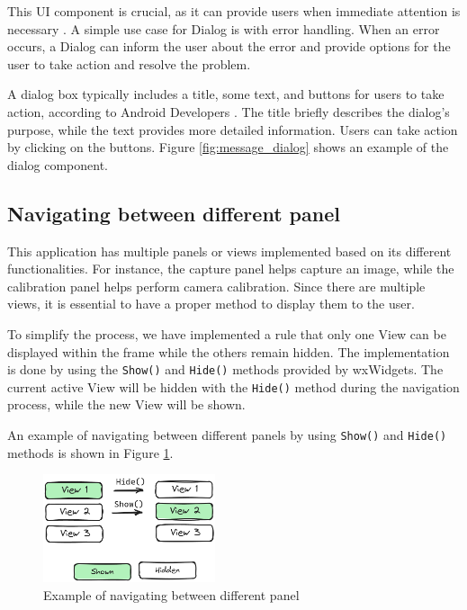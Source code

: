 This UI component is crucial, as it can provide users when immediate attention is necessary \cite{MaterialUI}. A simple use case for Dialog is with error handling. When an error occurs, a Dialog can inform the user about the error and provide options for the user to take action and resolve the problem.

A dialog box typically includes a title, some text, and buttons for users to take action, according to Android Developers \cite{Android_Developers}. The title briefly describes the dialog's purpose, while the text provides more detailed information. Users can take action by clicking on the buttons. Figure \ref{fig:message_dialog} shows an example of the dialog component.

\subsection{Navigating between different panel}
\label{subsec:navigating_between_different_panel}

This application has multiple panels or views implemented based on its different functionalities. For instance, the capture panel helps capture an image, while the calibration panel helps perform camera calibration. Since there are multiple views, it is essential to have a proper method to display them to the user.

To simplify the process, we have implemented a rule that only one View can be displayed within the frame while the others remain hidden. The implementation is done by using the \texttt{Show()} and \texttt{Hide()} methods provided by wxWidgets. The current active View will be hidden with the \texttt{Hide()} method during the navigation process, while the new View will be shown.

An example of navigating between different panels by using \texttt{Show()} and \texttt{Hide()} methods is shown in Figure \ref{fig:show_panel}.

\begin{figure}[!ht]
    \centering
    \includegraphics[width=0.45\textwidth]{texs/Part2/chapter4/image/showpanel.png}
    \caption{Example of navigating between different panel}
    \label{fig:show_panel}
\end{figure}

